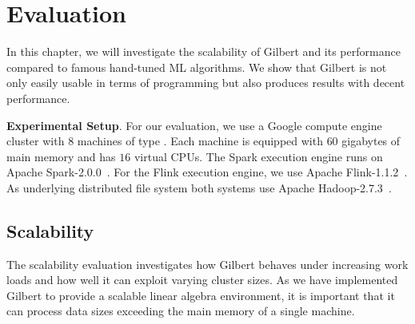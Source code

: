 \section{Evaluation}
\label{sec:evaluation}

In this chapter, we will investigate the scalability of Gilbert and its performance compared to famous hand-tuned ML algorithms.
We show that Gilbert is not only easily usable in terms of programming but also produces results with decent performance.

\textbf{Experimental Setup}. For our evaluation, we use a Google compute engine cluster with $8$ machines of type .
Each machine is equipped with $60$ gigabytes of main memory and has $16$ virtual CPUs. 
The Spark execution engine runs on Apache Spark-2.0.0~\cite{spark}.
For the Flink execution engine, we use Apache Flink-1.1.2~\cite{flink}. 
As underlying distributed file system both systems use Apache Hadoop-2.7.3~\cite{hadoop:2008a}.

\subsection{Scalability}

The scalability evaluation investigates how Gilbert behaves under increasing work loads and how well it can exploit varying cluster sizes.
As we have implemented Gilbert to provide a scalable linear algebra environment, it is important that it can process data sizes exceeding the main memory of a single machine.


